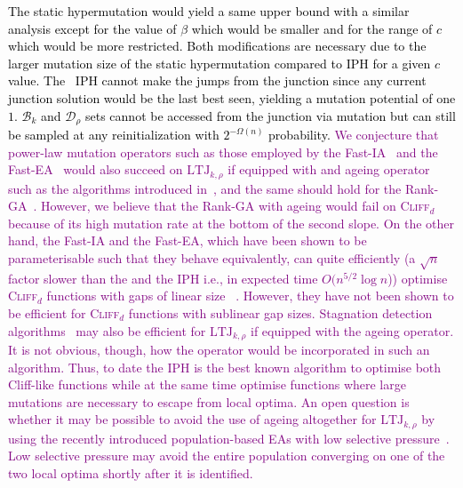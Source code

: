 \textcolor{black}{The static hypermutation would yield a same upper bound with a similar analysis except for the value of $\beta$ which would be smaller and for the range of $c$ which would be more restricted. Both modifications are necessary due to the larger mutation size of the static hypermutation compared to IPH for a given $c$ value. The \lastBest~IPH cannot make the jumps from the junction since any current junction solution would be the last best seen, yielding a mutation potential of one $1$. $\mathcal{B}_k$ and $\mathcal{D}_\rho$ sets cannot be accessed from the junction via mutation but can still be sampled at any reinitialization with $2^{-\Omega(n)}$ probability.}
\textcolor{purple}{We conjecture that power-law mutation operators such as those employed by the Fast-IA~\cite{CorusOlivetoYazdani2021TEVC} and the Fast-EA~\cite{DoerrGECCO2017FastGA} would also succeed on $\mathrm{LTJ}_{k,\rho}$ if equipped with and ageing operator such as the algorithms introduced in~\cite{CorusOlivetoYazdani2021TEVC}, and the same should hold for the Rank-GA~\cite{RankBasedMutation}. However, we believe that the Rank-GA with ageing would fail on \textsc{Cliff}$_d$ because of its high mutation rate at the bottom of the second slope. On the other hand, the Fast-IA and the Fast-EA, which have been shown to be parameterisable such that they behave equivalently, can quite efficiently (a $\sqrt{n}$ factor slower than the \firstBest and the \lastBest IPH i.e., in expected time $O(n^{5/2} \log n$))  optimise \textsc{Cliff}$_d$ functions with gaps of linear size~\cite{CorusOlivetoYazdani2021TEVC} . However, they have not been shown to be efficient for \textsc{Cliff}$_d$  functions with sublinear gap sizes. 
Stagnation detection algorithms~\cite{KW2024,RW2022,RW2023} may also be efficient for $\mathrm{LTJ}_{k,\rho}$ if equipped with the ageing operator. It is not obvious, though, how the operator would be incorporated in such an algorithm. Thus, to date the \firstBest{} IPH is the best known algorithm to optimise both Cliff-like functions while at the same time optimise functions where large mutations are necessary to escape from local optima. An open question is whether it may be possible to avoid the use of ageing altogether for $\mathrm{LTJ}_{k,\rho}$ by using the recently introduced population-based EAs with low selective pressure~\cite{CorusLissovoiOlivetoWittTELO2021,COZ25}. Low selective pressure may avoid the entire population converging on one of the two local optima shortly after it is identified.} 
